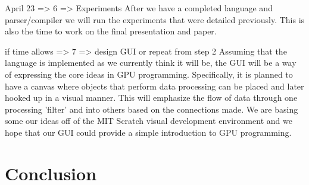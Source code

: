 \documentclass{article}
\begin{document}
April 23 => 6 => Experiments
  After we have a completed language and parser/compiler we will run the experiments that were detailed previously. This is also the time to work on the final presentation and paper. 
  
if time allows => 7 => design GUI or repeat from step 2
  Assuming that the language is implemented as we currently think it will be, the GUI will be a way of expressing the core ideas in GPU programming. Specifically, it is planned to have a canvas where objects that perform data processing can be placed and later hooked up in a visual manner. This will emphasize the flow of data through one processing 'filter' and into others based on the connections made. We are basing some our ideas off of the MIT Scratch visual development environment and we hope that our GUI could provide a simple introduction to GPU programming.

\section{Conclusion}


%
\end{document}
